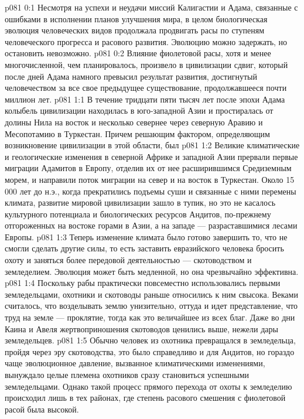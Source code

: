 \author{Архангел}
\vs p081 0:1 Несмотря на успехи и неудачи миссий Калигастии и Адама, связанные с ошибками в исполнении планов улучшения мира, в целом биологическая эволюция человеческих видов продолжала продвигать расы по ступеням человеческого прогресса и расового развития. Эволюцию можно задержать, но остановить невозможно.
\vs p081 0:2 Влияние фиолетовой расы, хотя и менее многочисленной, чем планировалось, произвело в цивилизации сдвиг, который после дней Адама намного превысил результат развития, достигнутый человечеством за все свое предыдущее существование, продолжавшееся почти миллион лет.
\vs p081 1:1 В течение тридцати пяти тысяч лет после эпохи Адама колыбель цивилизации находилась в юго\hyp{}западной Азии и простиралась от долины Нила на восток и несколько севернее через северную Аравию и Месопотамию в Туркестан. Причем решающим фактором, определяющим возникновение цивилизации в этой области, был 
\vs p081 1:2 Великие климатические и геологические изменения в северной Африке и западной Азии прервали первые миграции Адамитов в Европу, отделив их от нее расширившимся Средиземным морем, и направили поток миграции на север и на восток в Туркестан. Около 15 000 лет до н.э., когда прекратились подъемы суши и связанные с ними перемены климата, развитие мировой цивилизации зашло в тупик, но это не касалось культурного потенциала и биологических ресурсов Андитов, по\hyp{}прежнему отгороженных на востоке горами в Азии, а на западе --- разраставшимися лесами Европы.
\vs p081 1:3 Теперь изменение климата было готово завершить то, что не смогли сделать другие силы, то есть заставить евразийского человека бросить охоту и заняться более передовой деятельностью --- скотоводством и земледелием. Эволюция может быть медленной, но она чрезвычайно эффективна.
\vs p081 1:4 Поскольку рабы практически повсеместно использовались первыми земледельцами, охотники и скотоводы раньше относились к ним свысока. Веками считалось, что возделывать землю унизительно, оттуда и идет представление, что труд на земле --- проклятие, тогда как это величайшее из всех благ. Даже во дни Каина и Авеля жертвоприношения скотоводов ценились выше, нежели дары земледельцев.
\vs p081 1:5 Обычно человек из охотника превращался в земледельца, пройдя через эру скотоводства, это было справедливо и для Андитов, но гораздо чаще эволюционное давление, вызванное климатическими изменениями, вынуждало целые племена охотников сразу становиться успешными земледельцами. Однако такой процесс прямого перехода от охоты к земледелию происходил лишь в тех районах, где степень расового смешения с фиолетовой расой была высокой.
